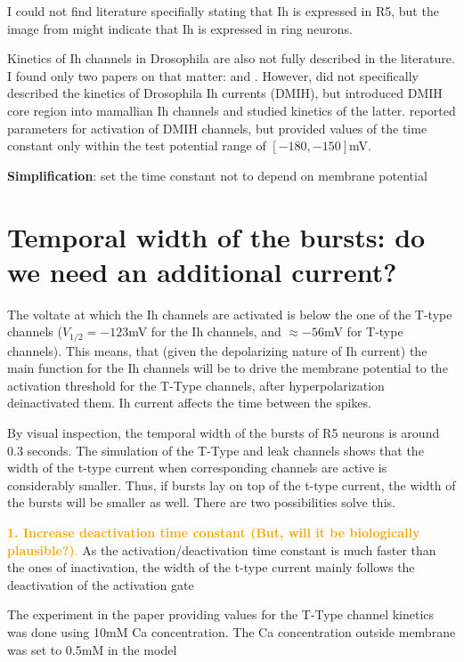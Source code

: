 \documentclass[11pt]{article}
\begin{document}
I could not find literature specifially stating that Ih is expressed in R5,
but the image from \cite{gonzalo-gomezIhCurrentNecessary2012} might indicate that
Ih is expressed in ring neurons.

Kinetics of Ih channels in Drosophila are also not fully described in the literature. I found
only two papers on that matter: \cite{gisselmannVariantsDrosophilaMelanogaster2005} and
\cite{ishiiPeripheralCterminalDomains2007}. However, \cite{ishiiPeripheralCterminalDomains2007}
did not specifically described the kinetics of Drosophila Ih currents (DMIH), but introduced DMIH
core region into mamallian Ih channels and studied kinetics of the latter. \cite{gisselmannVariantsDrosophilaMelanogaster2005}
reported parameters for activation of DMIH channels, but provided values of the time constant
only within the test potential range of $[-180, -150]$mV.

\textbf{Simplification}: set the time constant not to depend on membrane potential


\section{Temporal width of the bursts: do we need an additional current?}
    
The voltate at which the Ih channels are activated is below the one of the
T-type channels ($V_{1/2}=-123$mV for the Ih channels, and $\approx-56$mV for T-type
channels). This means, that (given the depolarizing nature of Ih current)
the main function for the Ih channels will be to drive the
membrane potential to the activation threshold for the T-Type channels, after
hyperpolarization deinactivated them. Ih current affects the time between the spikes.

By visual inspection, the temporal width of the bursts of R5 neurons is around
0.3 seconds. The simulation of the T-Type and leak channels shows that the width of the
t-type current when corresponding channels are active is considerably smaller. Thus,
if bursts lay on top of the t-type current, the width of the bursts will be smaller
as well. There are two possibilities solve this.

\textcolor{orange}{
    \textbf{1. Increase deactivation time constant (But, will it be biologically plausible?)}.
}
As the activation/deactivation time constant
is much faster than the ones of inactivation, the width of the t-type current mainly
follows the deactivation of the activation gate

The experiment in the paper providing values for the T-Type channel kinetics 
was done using 10mM Ca concentration. The Ca concentration outside membrane was
set to 0.5mM in the model
\end{document}

